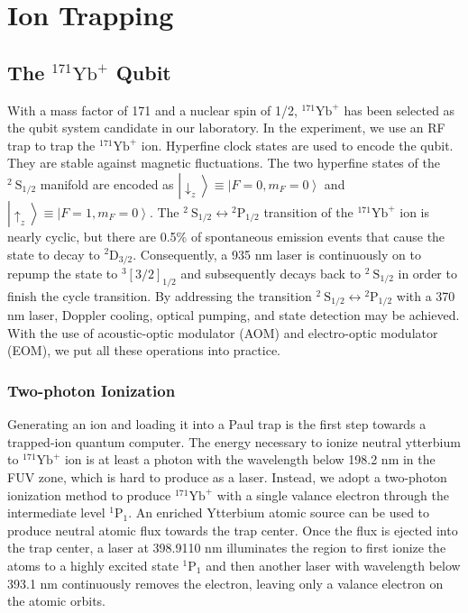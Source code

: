 
\chapter{Ion Trapping}

\section{The \texorpdfstring{${ }^{171} \mathrm{Yb}^{+}$}{} Qubit}

With a mass factor of 171 and a nuclear spin of 1/2, ${ }^{171} \mathrm{Yb}^{+}$ has been selected as the qubit system candidate in our laboratory. In the experiment, we use an RF trap to trap the ${ }^{171} \mathrm{Yb}^{+}$ ion. Hyperfine clock states are used to encode the qubit. They are stable against magnetic fluctuations. The two hyperfine states of the ${ }^2 \mathrm{~S}_{1 / 2}$ manifold are encoded as $\left|\downarrow_z\right\rangle \equiv\left|F=0, m_F=0\right\rangle$ and $\left|\uparrow_z\right\rangle \equiv\left|F=1, m_F=0\right\rangle$. The ${ }^2 \mathrm{~S}_{1 / 2} \leftrightarrow{ }^2 \mathrm{P}_{1 / 2}$ transition of the ${ }^{171} \mathrm{Yb}^{+}$ ion is nearly cyclic, but there are 0.5\% of spontaneous emission events that cause the state to decay to ${ }^2 \mathrm{D}_{3 / 2}$. Consequently, a 935 nm laser is continuously on to repump the state to ${ }^{3} [3 / 2]_{1 / 2}$ and subsequently decays back to ${ }^2 \mathrm{~S}_{1 / 2}$ in order to finish the cycle transition. By addressing the transition ${ }^2 \mathrm{~S}_{1 / 2} \leftrightarrow{ }^2 \mathrm{P}_{1 / 2}$ with a 370 nm laser, Doppler cooling, optical pumping, and state detection may be achieved. With the use of acoustic-optic modulator (AOM) and electro-optic modulator (EOM), we put all these operations into practice.

\subsection{Two-photon Ionization}

Generating an ion and loading it into a Paul trap is the first step towards a trapped-ion quantum computer. The energy necessary to ionize neutral ytterbium to ${ }^{171} \mathrm{Yb}^{+}$ ion is at least a photon with the wavelength below 198.2 nm in the FUV zone, which is hard to produce as a laser. Instead, we adopt a two-photon ionization method to produce ${ }^{171} \mathrm{Yb}^{+}$ with a single valance electron through the intermediate level ${ }^1 \mathrm{P}_1$. An enriched Ytterbium atomic source can be used to produce neutral atomic flux towards the trap center. Once the flux is ejected into the trap center, a laser at 398.9110 nm illuminates the region to first ionize the atoms to a highly excited state ${ }^1 \mathrm{P}_1$ and then another laser with wavelength below 393.1 nm continuously removes the electron, leaving only a valance electron on the atomic orbits.

